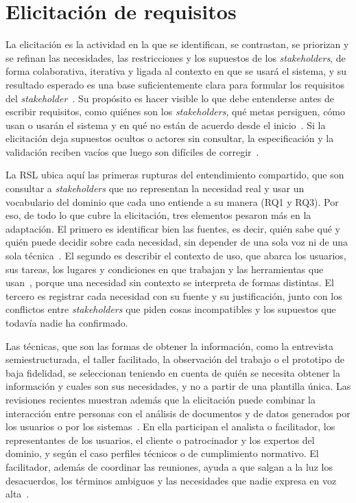 \documentclass[12pt,letterpaper,oneside]{report}
\begin{document}
\section{Elicitación de requisitos}
\label{sec:car_elicitacion}
La elicitación es la actividad en la que se identifican, se contrastan, se
priorizan y se refinan las necesidades, las restricciones y los supuestos de los
\textit{stakeholders}, de forma colaborativa, iterativa y ligada al contexto en
que se usará el sistema, y su resultado esperado es una base suficientemente
clara para formular los requisitos del \textit{stakeholder}~\cite{iso29148}. Su
propósito es hacer visible lo que debe entenderse antes de escribir requisitos,
como quiénes son los \textit{stakeholders}, qué metas persiguen, cómo usan o
usarán el sistema y en qué no están de acuerdo desde el
inicio~\cite{fuller2021blurring}. Si la elicitación deja supuestos ocultos o
actores sin consultar, la especificación y la validación reciben vacíos que
luego son difíciles de corregir~\cite{agredo2022exploratory}.

La RSL ubica aquí las primeras rupturas del entendimiento compartido, que son
consultar a \textit{stakeholders} que no representan la necesidad real y usar un
vocabulario del dominio que cada uno entiende a su manera (RQ1 y RQ3). Por eso,
de todo lo que cubre la elicitación, tres elementos pesaron más en la
adaptación. El primero es identificar bien las fuentes, es decir, quién sabe qué
y quién puede decidir sobre cada necesidad, sin depender de una sola voz ni de
una sola técnica~\cite{iso25064}. El segundo es describir el contexto de uso,
que abarca los usuarios, sus tareas, los lugares y condiciones en que trabajan y
las herramientas que usan~\cite{iso25063}, porque una necesidad sin contexto se
interpreta de formas distintas. El tercero es registrar cada necesidad con su
fuente y su justificación, junto con los conflictos entre \textit{stakeholders}
que piden cosas incompatibles y los supuestos que todavía nadie ha confirmado.

Las técnicas, que son las formas de obtener la información, como la entrevista
semiestructurada, el taller facilitado, la observación del trabajo o el
prototipo de baja fidelidad, se seleccionan teniendo en cuenta de quién se necesita 
obtener la información y cuales son sus necesidades, y
no a partir de una plantilla única. Las revisiones recientes muestran además que
la elicitación puede combinar la interacción entre personas con el análisis de
documentos y de datos generados por los usuarios o por los
sistemas~\cite{lim2021data,akram2024}. En ella participan el analista o
facilitador, los representantes de los usuarios, el cliente o patrocinador y los
expertos del dominio, y según el caso perfiles técnicos o de cumplimiento
normativo. El facilitador, además de coordinar las reuniones, ayuda a que salgan
a la luz los desacuerdos, los términos ambiguos y las necesidades que nadie
expresa en voz alta~\cite{agredo2022thesis}.
\end{document}
